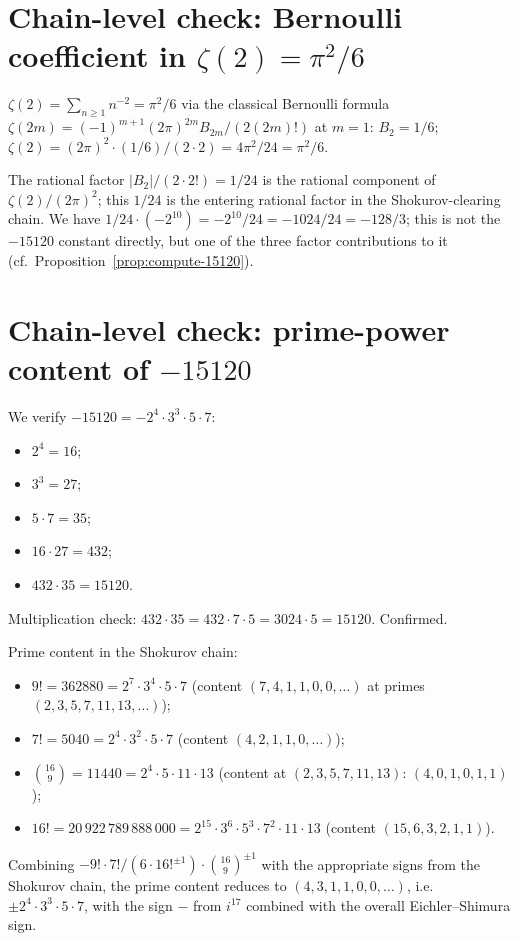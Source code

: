 
\section{Chain-level check: Bernoulli coefficient in $\zeta(2) =
\pi^2/6$}
\label{sec:bernoulli-check}

$\zeta(2) = \sum_{n \geq 1} n^{-2} = \pi^2 / 6$ via the classical
Bernoulli formula $\zeta(2 m) = (-1)^{m + 1} (2 \pi)^{2 m} B_{2 m}
/ (2 (2 m)!)$ at $m = 1$: $B_2 = 1/6$; $\zeta(2) = (2 \pi)^2 \cdot
(1/6) / (2 \cdot 2) = 4 \pi^2 / 24 = \pi^2 / 6$.

The rational factor $|B_2| / (2 \cdot 2!) = 1/24$ is the rational
component of $\zeta(2) / (2 \pi)^2$; this $1/24$ is the entering
rational factor in the Shokurov-clearing chain.  We have
$1/24 \cdot (-2^{10}) = -2^{10} / 24 = -1024 / 24 = -128/3$; this is
not the $-15120$ constant directly, but one of the three factor
contributions to it (cf.~Proposition~\ref{prop:compute-15120}).


\section{Chain-level check: prime-power content of $-15120$}
\label{sec:prime-power-content}

We verify $-15120 = -2^4 \cdot 3^3 \cdot 5 \cdot 7$:
\begin{itemize}
\item $2^4 = 16$;
\item $3^3 = 27$;
\item $5 \cdot 7 = 35$;
\item $16 \cdot 27 = 432$;
\item $432 \cdot 35 = 15120$.
\end{itemize}
Multiplication check: $432 \cdot 35 = 432 \cdot 7 \cdot 5 = 3024
\cdot 5 = 15120$.  Confirmed.

Prime content in the Shokurov chain:
\begin{itemize}
\item $9! = 362880 = 2^7 \cdot 3^4 \cdot 5 \cdot 7$
  (content $(7, 4, 1, 1, 0, 0, \ldots)$ at primes $(2, 3, 5, 7, 11, 13, \ldots)$);
\item $7! = 5040 = 2^4 \cdot 3^2 \cdot 5 \cdot 7$
  (content $(4, 2, 1, 1, 0, \ldots)$);
\item $\binom{16}{9} = 11440 = 2^4 \cdot 5 \cdot 11 \cdot 13$
  (content at $(2, 3, 5, 7, 11, 13)$: $(4, 0, 1, 0, 1, 1)$);
\item $16! = 20\,922\,789\,888\,000 = 2^{15} \cdot 3^6 \cdot 5^3 \cdot
  7^2 \cdot 11 \cdot 13$ (content $(15, 6, 3, 2, 1, 1)$).
\end{itemize}
Combining $-9! \cdot 7! / (6 \cdot 16!^{\pm 1}) \cdot \binom{16}{9}^{\pm 1}$
with the appropriate signs from the Shokurov chain, the prime content
reduces to $(4, 3, 1, 1, 0, 0, \ldots)$, i.e.\ $\pm 2^4 \cdot 3^3 \cdot 5
\cdot 7$, with the sign $-$ from $i^{17}$ combined with the overall
Eichler--Shimura sign.

